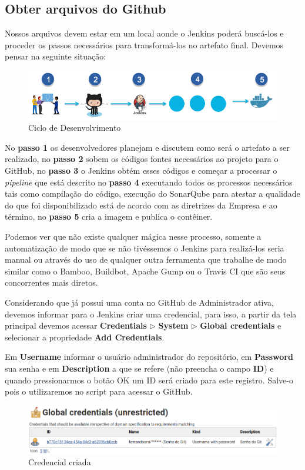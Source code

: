 \documentclass[a4paper,11pt]{article}
\begin{document}
\subsection{Obter arquivos do Github}
Nossos arquivos devem estar em um local aonde o Jenkins poderá buscá-los e proceder os passos necessários para transformá-los no artefato final. Devemos pensar na seguinte situação:
\begin{figure}[H]
	\centering
	\includegraphics[width=1.0\textwidth]{imagens/cicloDev.png}
	\caption{Ciclo de Desenvolvimento}
\end{figure}

No \textbf{passo 1} os desenvolvedores planejam e discutem como será o artefato a ser realizado, no \textbf{passo 2} sobem os códigos fontes necessários ao projeto para o GitHub, no \textbf{passo 3} o Jenkins obtém esses códigos e começar a processar o \textit{pipeline} que está descrito no \textbf{passo 4} executando todos os processos necessários tais como compilação do código, execução do SonarQube para atestar a qualidade do que foi disponibilizado está de acordo com as diretrizes da Empresa e ao término, no \textbf{passo 5} cria a imagem e publica o contêiner.

Podemos ver que não existe qualquer mágica nesse processo, somente a automatização de modo que se não tivéssemos o Jenkins para realizá-los seria manual ou através do uso de qualquer outra ferramenta que trabalhe de modo similar como o Bamboo, Buildbot, Apache Gump ou o Travis CI que são seus concorrentes mais diretos.

Considerando que já possui uma conta no GitHub de Administrador ativa, devemos informar para o Jenkins criar uma credencial, para isso, a partir da tela principal devemos acessar \textbf{Credentials} $\triangleright$ \textbf{System} $\triangleright$ \textbf{Global credentials} e selecionar a propriedade \textbf{Add Credentials}.

Em \textbf{Username} informar o usuário administrador do repositório, em \textbf{Password} sua senha e em \textbf{Description} a que se refere (não preencha o campo \textbf{ID}) e quando pressionarmos o botão OK um ID será criado para este registro. Salve-o pois o utilizaremos no script para acessar o GitHub.
\begin{figure}[H]
	\centering
	\includegraphics[width=1.0\textwidth]{imagens/credentials.png}
	\caption{Credencial criada}
\end{figure}
\end{document}
